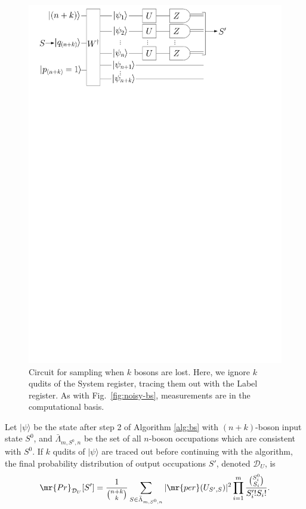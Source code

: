 \begin{figure}
\includegraphics[width=\linewidth]{noisy_circuit/lost_circuit}
\caption{Circuit for sampling when $k$ bosons are lost. 
Here, we ignore $k$ qudits of the System register, tracing them out with the Label register. 
As with Fig.~\ref{fig:noisy-bs}, measurements are in the computational basis.}
\label{fig:lost-bs}
\end{figure}

\begin{theorem}
Let $|\psi\rangle$ be the state after step 2 of Algorithm \ref{alg:bs} with $(n+k)$-boson input state $S^0$, and $\bar{\Lambda}_{m,S^0,n}$ be the set of all $n$-boson occupations which are consistent with $S^0$.
If $k$ qudits of $|\psi\rangle$ are traced out before continuing with the algorithm, the final probability distribution of output occupations $S'$, denoted $\mathcal{D}_U$, is
\begin{equation}
\mr{Pr}_{\mathcal{D}_U}[S'] = \frac{1}{\binom{n+k}{k}}\sum_{S \in \bar{\Lambda}_{m,S^0,n}} |\mr{per}(U_{S',S})|^2 \prod_{i=1}^m \frac{\binom{S_i^0}{S_i}}{S'_i! S_i!} .
\end{equation}
\end{theorem}


